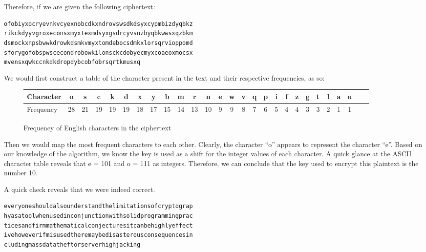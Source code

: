 \documentclass[12pt, a4paper, draft]{report}
\begin{document}

\pagebreak
Therefore, if we are given the following ciphertext:


\begin{alltt}
ofobiyxocryevnkvcyexnobcdkxndrovswsdkdsyxcypmbizdyqbkz
rikckdyyvgroxeconsxmyxtexmdsyxgsdrcyvsnzbyqbkwwsxqzbkm
dsmockxnpsbwwkdrowkdsmkvmyxtomdebocsdmkxlorsqrvioppomd
sforygofobspwscecondrobowkilonsckcdobyecmyxcoaeoxmocsx
mvensxqwkccnkdkdropdybcobfobrsqrtkmusxq
\end{alltt}

We would first construct a table of the character present in the text and
their respective frequencies, as so:

\begin{figure}[h]
\begin{center}
\begin{tabular}{l*{26}{c}}
\toprule
Character & o & s & c & k & d & x & y & b & m & r & n & e & w & v & q & p & i & f & z & g & t & l & a & u\\
\midrule
Frequency & 28 & 21 & 19 & 19 & 19 & 18 & 17 & 15 & 14 & 13 & 10 & 9 & 9 & 8 & 7 & 6 & 5 & 4 & 4 & 3 & 3 & 2 & 1 & 1\\
\bottomrule
\end{tabular}
\end{center}
\caption{Frequency of English characters in the ciphertext}
\end{figure}

Then we would map the most frequent characters to each other.
Clearly, the character ``o'' appears to represent the character ``e''.
Based on our knowledge of the algorithm, we know the key is used as
a shift for the integer values of each character. A quick glance at the
ASCII character table reveals that e = 101 and o = 111 as integers.
Therefore, we can conclude that the key used to encrypt this plaintext
is the number 10.

\pagebreak
A quick check reveals that we were indeed correct.

\begin{alltt}
everyoneshouldalsounderstandthelimitationsofcryptograp
hyasatoolwhenusedinconjunctionwithsolidprogrammingprac
ticesandfirmmathematicalconjecturesitcanbehighlyeffect
ivehoweverifmisusedtheremaybedisasterousconsequencesin
cludingmassdatatheftorserverhighjacking
\end{alltt}
\end{document}
